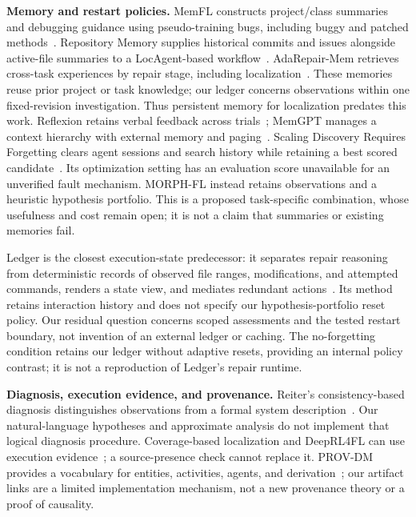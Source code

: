 \documentclass[letterpaper,journal]{IEEEtran}
\newcommand{\tool}{MORPH-FL}
\begin{document}
\textbf{Memory and restart policies.} MemFL constructs project/class summaries and debugging guidance using pseudo-training bugs, including buggy and patched methods~\cite{memfl2025}. Repository Memory supplies historical commits and issues alongside active-file summaries to a LocAgent-based workflow~\cite{repomem2026}. AdaRepair-Mem retrieves cross-task experiences by repair stage, including localization~\cite{adarepair2026}. These memories reuse prior project or task knowledge; our ledger concerns observations within one fixed-revision investigation. Thus persistent memory for localization predates this work. Reflexion retains verbal feedback across trials~\cite{reflexion2023}; MemGPT manages a context hierarchy with external memory and paging~\cite{memgpt2024}. Scaling Discovery Requires Forgetting clears agent sessions and search history while retaining a best scored candidate~\cite{forgetting2026}. Its optimization setting has an evaluation score unavailable for an unverified fault mechanism. \tool{} instead retains observations and a heuristic hypothesis portfolio. This is a proposed task-specific combination, whose usefulness and cost remain open; it is not a claim that summaries or existing memories fail.

Ledger is the closest execution-state predecessor: it separates repair reasoning from deterministic records of observed file ranges, modifications, and attempted commands, renders a state view, and mediates redundant actions~\cite{ledger2026}. Its method retains interaction history and does not specify our hypothesis-portfolio reset policy. Our residual question concerns scoped assessments and the tested restart boundary, not invention of an external ledger or caching. The no-forgetting condition retains our ledger without adaptive resets, providing an internal policy contrast; it is not a reproduction of Ledger's repair runtime.

\textbf{Diagnosis, execution evidence, and provenance.} Reiter's consistency-based diagnosis distinguishes observations from a formal system description~\cite{reiter1987}. Our natural-language hypotheses and approximate analysis do not implement that logical diagnosis procedure. Coverage-based localization and DeepRL4FL can use execution evidence~\cite{deeprl4fl2021}; a source-presence check cannot replace it. PROV-DM provides a vocabulary for entities, activities, agents, and derivation~\cite{prov2013}; our artifact links are a limited implementation mechanism, not a new provenance theory or a proof of causality.
\end{document}
